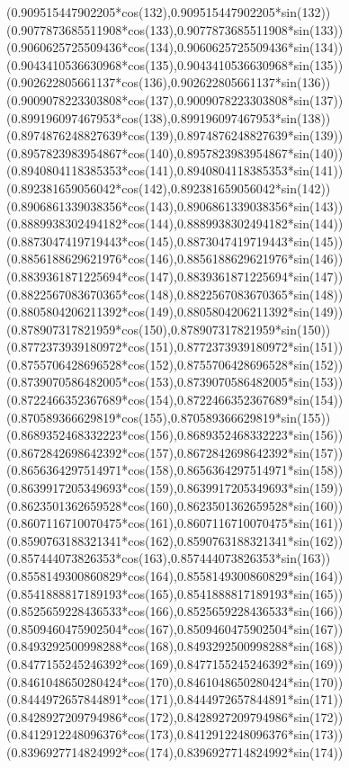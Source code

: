 {({0.909515447902205*cos(132)},{0.909515447902205*sin(132)})
({0.9077873685511908*cos(133)},{0.9077873685511908*sin(133)})
({0.9060625725509436*cos(134)},{0.9060625725509436*sin(134)})
({0.9043410536630968*cos(135)},{0.9043410536630968*sin(135)})
({0.902622805661137*cos(136)},{0.902622805661137*sin(136)})
({0.9009078223303808*cos(137)},{0.9009078223303808*sin(137)})
({0.899196097467953*cos(138)},{0.899196097467953*sin(138)})
({0.8974876248827639*cos(139)},{0.8974876248827639*sin(139)})
({0.8957823983954867*cos(140)},{0.8957823983954867*sin(140)})
({0.8940804118385353*cos(141)},{0.8940804118385353*sin(141)})
({0.892381659056042*cos(142)},{0.892381659056042*sin(142)})
({0.8906861339038356*cos(143)},{0.8906861339038356*sin(143)})
({0.8889938302494182*cos(144)},{0.8889938302494182*sin(144)})
({0.8873047419719443*cos(145)},{0.8873047419719443*sin(145)})
({0.8856188629621976*cos(146)},{0.8856188629621976*sin(146)})
({0.8839361871225694*cos(147)},{0.8839361871225694*sin(147)})
({0.8822567083670365*cos(148)},{0.8822567083670365*sin(148)})
({0.8805804206211392*cos(149)},{0.8805804206211392*sin(149)})
({0.878907317821959*cos(150)},{0.878907317821959*sin(150)})
({0.8772373939180972*cos(151)},{0.8772373939180972*sin(151)})
({0.8755706428696528*cos(152)},{0.8755706428696528*sin(152)})
({0.8739070586482005*cos(153)},{0.8739070586482005*sin(153)})
({0.8722466352367689*cos(154)},{0.8722466352367689*sin(154)})
({0.870589366629819*cos(155)},{0.870589366629819*sin(155)})
({0.8689352468332223*cos(156)},{0.8689352468332223*sin(156)})
({0.8672842698642392*cos(157)},{0.8672842698642392*sin(157)})
({0.8656364297514971*cos(158)},{0.8656364297514971*sin(158)})
({0.8639917205349693*cos(159)},{0.8639917205349693*sin(159)})
({0.8623501362659528*cos(160)},{0.8623501362659528*sin(160)})
({0.8607116710070475*cos(161)},{0.8607116710070475*sin(161)})
({0.8590763188321341*cos(162)},{0.8590763188321341*sin(162)})
({0.857444073826353*cos(163)},{0.857444073826353*sin(163)})
({0.8558149300860829*cos(164)},{0.8558149300860829*sin(164)})
({0.8541888817189193*cos(165)},{0.8541888817189193*sin(165)})
({0.8525659228436533*cos(166)},{0.8525659228436533*sin(166)})
({0.8509460475902504*cos(167)},{0.8509460475902504*sin(167)})
({0.8493292500998288*cos(168)},{0.8493292500998288*sin(168)})
({0.8477155245246392*cos(169)},{0.8477155245246392*sin(169)})
({0.8461048650280424*cos(170)},{0.8461048650280424*sin(170)})
({0.8444972657844891*cos(171)},{0.8444972657844891*sin(171)})
({0.8428927209794986*cos(172)},{0.8428927209794986*sin(172)})
({0.8412912248096376*cos(173)},{0.8412912248096376*sin(173)})
({0.8396927714824992*cos(174)},{0.8396927714824992*sin(174)})
}
